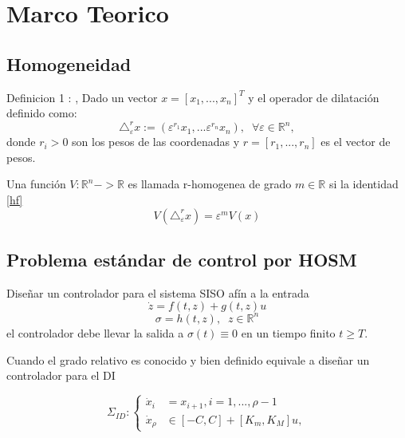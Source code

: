 \chapter{Marco Teorico}	\label{Cap2}

\section{Homogeneidad}
Definicion 1 : \cite{bacciotti2005}, \cite{bernuau2014h}  Dado un vector $x=[x_1,...,x_n]^T$ 
y el operador de dilatación definido como:
\begin{equation}
    \triangle^r_\varepsilon x:= \left(\varepsilon^{r_1}x_1,...\varepsilon^{r_n}x_n \right), \;\; \forall \varepsilon \in \mathbb{R}^n,
\end{equation}
donde $r_i>0$ son los pesos de las coordenadas y $r=[r_1,...,r_n]$ es el vector de pesos.

Una función $V:\mathbb{R}^n->\mathbb{R}$ es llamada r-homogenea de grado $m\in \mathbb{R}$ si la identidad \ref{hf}
\begin{equation}
    V(\triangle^r_\varepsilon x)= \varepsilon^{m}V(x)
    \label{hf}
\end{equation}

\section{Problema estándar de control por HOSM}
Diseñar un controlador para el sistema SISO afín a la entrada
\begin{equation}
    \dot{z}=f(t,z)+g(t,z)u
    \end{equation}
    \begin{equation}
    \sigma=h(t,z), \;\;z\in \mathbb{R}^n
    \end{equation}
    el controlador debe llevar la salida a $\sigma(t)\equiv 0$ en un tiempo finito $t\geq T$.

    Cuando el grado relativo es conocido y bien definido equivale a diseñar un controlador para el DI

    \begin{equation}
        \Sigma_{ID} :
          \left \{
            \begin{aligned}
              \dot{x}_i&=x_{i+1} ,i=1,...,\rho -1\\
              \dot{x}_\rho &\in [-C,C]+[K_m,K_M]u, 
            \end{aligned}
          \right .
        \end{equation}
    
